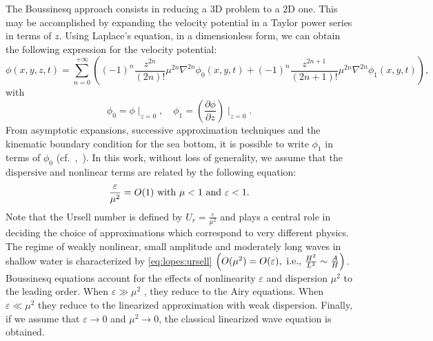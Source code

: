 The Boussinesq approach consists in reducing a $3$D problem
to a $2$D one.  This may be accomplished by expanding the
velocity potential in a Taylor power series in terms of $z$.
Using Laplace's equation, in a dimensionless form, we can
obtain the following expression for the velocity potential:
\begin{equation}
\phi(x,y,z,t)=\sum_{n=0}^{+\infty}\left((-1)^n\frac{z^{2n}}{(2n)!}\mu^{2n}\nabla^{2n}\phi_0(x,y,t)+
(-1)^n
\frac{z^{2n+1}}{(2n+1)!}\mu^{2n}\nabla^{2n}\phi_1(x,y,t)\right),
\end{equation}
with
\begin{equation}
\phi_0=\phi\mid_{ z=0},\quad
\phi_1=\left(\frac{\partial \phi}{\partial z}\right)\mid_{z=0}\!.
\end{equation}
From asymptotic expansions, successive approximation
techniques and the kinematic boundary condition for the sea
bottom, it is possible to write $\phi_1$ in terms of
$\phi_0$ (cf.~\cite{ChenLiu1994},~\cite{ZhaoTengCheng2004}).
In this work, without loss of generality, we assume that the
dispersive and nonlinear terms are related by the following
equation:
\begin{equation}\label{eq:lopes:ursell}
\frac{\varepsilon}{\mu^2}=O(1)\ {\rm with}\ \mu<1\ {\rm
  and}\ \varepsilon<1.
\end{equation}
Note that the Ursell number is defined by $\displaystyle
U_r=\frac{\varepsilon}{\mu^2}$ and plays a central role in
deciding the choice of approximations which correspond to
very different physics.  The regime of weakly nonlinear,
small amplitude and moderately long waves in shallow water
is characterized by \eqref{eq:lopes:ursell}
$\left(O(\mu^2)=O(\varepsilon), {\ \rm i.e.,\ }
\frac{H^2}{L^2}\sim\frac{A}{H} \right)$.  Boussinesq
equations account for the effects of nonlinearity
$\varepsilon$ and dispersion $\mu^2$ to the leading order.
When $\varepsilon\gg \mu^2$ , they reduce to the Airy
equations.  When $\varepsilon\ll \mu^2$ they reduce to the
linearized approximation with weak dispersion.  Finally, if
we assume that $\varepsilon\rightarrow 0$ and
$\mu^2\rightarrow 0$, the classical linearized wave equation
is obtained.

